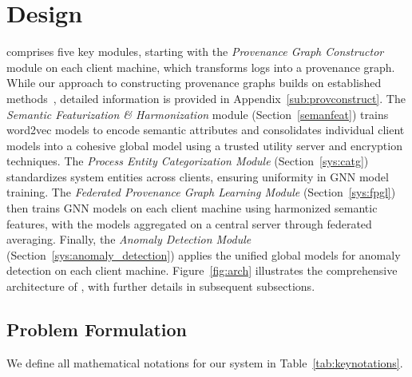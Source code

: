 \section{Design}
\label{sec:methodology}



\Sys comprises five key modules, starting with the \textit{Provenance Graph Constructor} module on each client machine, which transforms logs into a provenance graph. While our approach to constructing provenance graphs builds on established methods~\cite{inam2023sok,nodoze2019,mpi+ma,loggc,lpm2015,hossain2017sleuth}, detailed information is provided in Appendix~\ref{sub:provconstruct}. The \textit{Semantic Featurization \& Harmonization} module (Section~\ref{semanfeat}) trains word2vec models to encode semantic attributes and consolidates individual client models into a cohesive global model using a trusted utility server and encryption techniques. The \textit{Process Entity Categorization Module} (Section~\ref{sys:catg}) standardizes system entities across clients, ensuring uniformity in GNN model training. The \textit{Federated Provenance Graph Learning Module} (Section~\ref{sys:fpgl}) then trains GNN models on each client machine using harmonized semantic features, with the models aggregated on a central server through federated averaging. Finally, the \textit{Anomaly Detection Module} (Section~\ref{sys:anomaly_detection}) applies the unified global models for anomaly detection on each client machine. Figure~\ref{fig:arch} illustrates the comprehensive architecture of \Sys, with further details in subsequent subsections.

\subsection{Problem Formulation}

We define all mathematical notations for our system in Table~\ref{tab:keynotations}.

